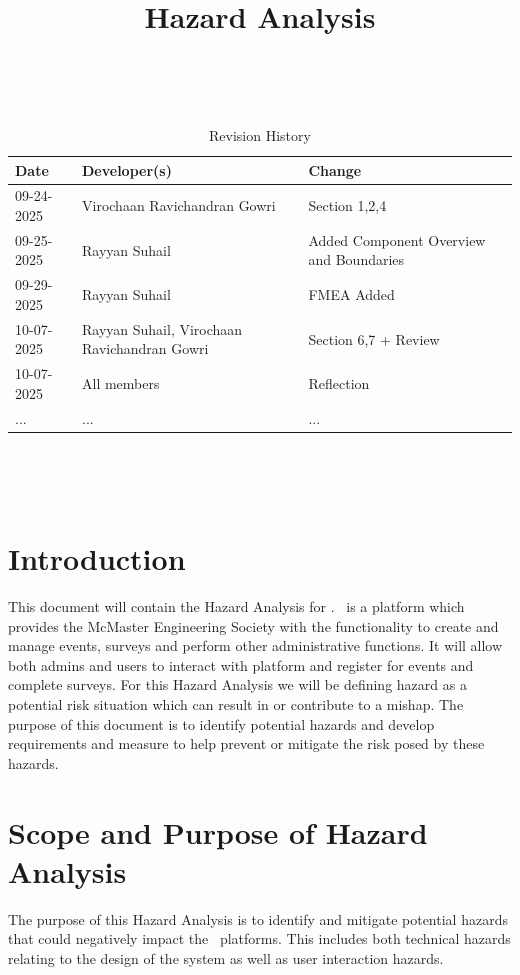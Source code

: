 \documentclass[12pt]{article}
\title{Hazard Analysis\\\progname}
\author{\authname}
\date{}
\begin{document}
\maketitle
\thispagestyle{empty}

~\newpage


\begin{table}[hp]
\caption{Revision History} \label{TblRevisionHistory}
\begin{tabularx}{\textwidth}{llX}
\toprule
\textbf{Date} & \textbf{Developer(s)} & \textbf{Change}\\
\midrule
09-24-2025 & Virochaan Ravichandran Gowri & Section 1,2,4\\
09-25-2025 & Rayyan Suhail & Added Component Overview and Boundaries\\
09-29-2025 & Rayyan Suhail & FMEA Added\\
10-07-2025 & Rayyan Suhail, Virochaan Ravichandran Gowri  & Section 6,7 + Review\\
10-07-2025 & All members & Reflection\\
... & ... & ...\\
\bottomrule
\end{tabularx}
\end{table}

~\newpage

\tableofcontents

~\newpage

\section{Introduction}
This document will contain the Hazard Analysis for \teamname. \teamname \ is a platform which provides the McMaster Engineering Society with the functionality to create and manage events, surveys and perform other administrative functions. It will allow both admins and users to interact with platform and register for events and complete surveys. For this Hazard Analysis we will be defining hazard as a potential risk situation which can result in or contribute to a mishap. The purpose of this document is to identify potential hazards and develop requirements and measure to help prevent or mitigate the risk posed by these hazards.

\section{Scope and Purpose of Hazard Analysis}
The purpose of this Hazard Analysis is to identify and mitigate potential hazards that could negatively impact the \teamname \ platforms. This includes both technical hazards relating to the design of the system as well as user interaction hazards.
\end{document}
